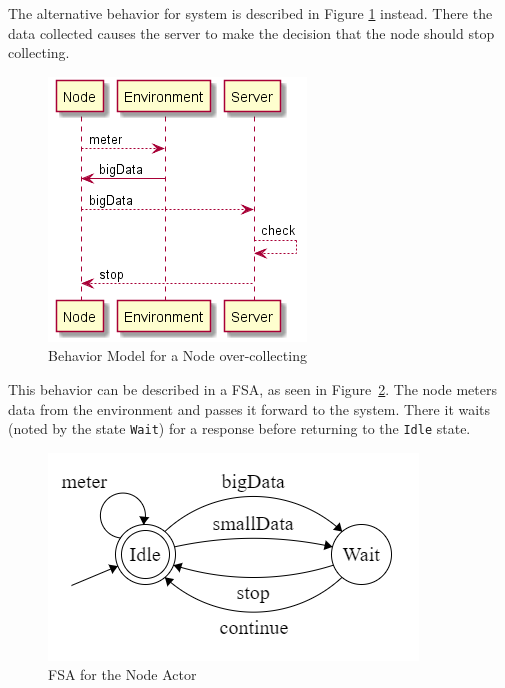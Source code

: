 The alternative behavior for system is described in Figure \ref{fig:node_behav_bigData} instead. There the data collected causes the server to make the decision that the node should stop collecting.

\begin{figure}[ht]
    \includegraphics[scale=1]{include/figures/node_behav_bigData}
    \caption{Behavior Model for a Node over-collecting}
    \label{fig:node_behav_bigData}
\end{figure}

This behavior can be described in a FSA, as seen in Figure~\ref{fig:node_states}. The node meters data from the environment and passes it forward to the system. There it waits (noted by the state \texttt{Wait}) for a response before returning to the \texttt{Idle} state.

\begin{figure}[ht]
    \includegraphics{include/figures/node_actor_fsm}
    \caption{FSA for the Node Actor}
    \label{fig:node_states}
\end{figure}




